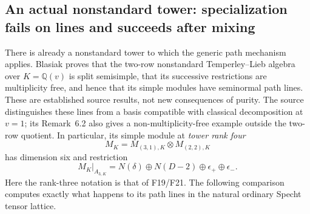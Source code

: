 \documentclass[11pt,a4paper]{article}
\newcommand{\Q}{\mathbb Q}\newcommand{\Z}{\mathbb Z}\newcommand{\C}{\mathbb C}\newcommand{\N}{\mathbb N}\newcommand{\F}{\mathbb F}
\newcommand{\fid}[1]{\textsf{#1}}\newcommand{\gate}[1]{\textsf{#1}}
\theoremstyle{named}\newtheorem{finding}{Finding}[section]
\theoremstyle{definition}\newtheorem{definition}[finding]{Definition}
\theoremstyle{remark}\newtheorem{remark}[finding]{Remark}
\begin{document}
\subsection{An actual nonstandard tower: specialization fails on lines and succeeds after mixing}
There is already a nonstandard tower to which the generic path mechanism
applies. Blasiak \cite[Theorem~5.1, p.~14; Proposition~5.2, pp.~14--15;
Definition~6.1, p.~23]{BlasiakRep} proves that the two-row nonstandard
Temperley--Lieb algebra over $K=\Q(v)$ is split semisimple, that its
successive restrictions are multiplicity free, and hence that its simple
modules have seminormal path lines. These are established source results,
not new consequences of purity. The source distinguishes these lines
from a basis compatible with classical decomposition at $v=1$; its
Remark~6.2 also gives a non-multiplicity-free example outside the
two-row quotient. In particular, its simple module at \emph{tower rank
four}
\[
 M_K=M_{(3,1),K}\otimes M_{(2,2),K}
\]
has dimension six and restriction
\begin{equation}\label{eq:towerrestriction}
 M_K|_{A_{3,K}}=N(\delta)\oplus N(D-2)\oplus\epsilon_+
                  \oplus\epsilon_-.
\end{equation}
Here the rank-three notation is that of \fid{F19}/\fid{F21}.
The following comparison computes exactly what happens to its path lines
in the natural ordinary Specht tensor lattice.
\end{document}
